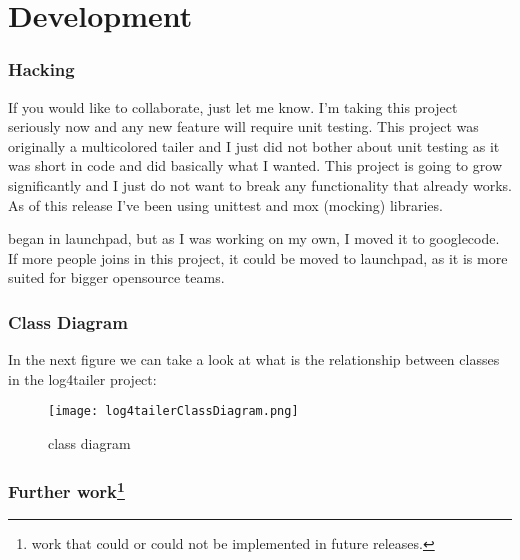 \part{Development}
\section{Hacking}
If you would like to collaborate, just let me know. I'm taking this project seriously now and 
any new feature will require unit testing. This project was originally a multicolored tailer and I just 
did not bother about unit testing as it was short in code and did basically what I wanted. This project is 
going to grow significantly and I just do not want to break any functionality that already works. As of this 
release I've been using unittest and mox (mocking) libraries. 

\logftailer{} began in launchpad, but as I was working on my own, I moved it to googlecode. If more people joins 
in this project, it could be moved to launchpad, as it is more suited for bigger opensource teams.

\section{Class Diagram}
In the next figure we can take a look at what is the relationship between classes in the log4tailer 
project:

\begin{figure}[htp]
\centering
\texttt{[image: log4tailerClassDiagram.png]}
\caption{\logftailer{} class diagram}\label{fig:class diagram}
\end{figure}



\section{Further work\footnote{work that could or could not be implemented in future releases.}}

